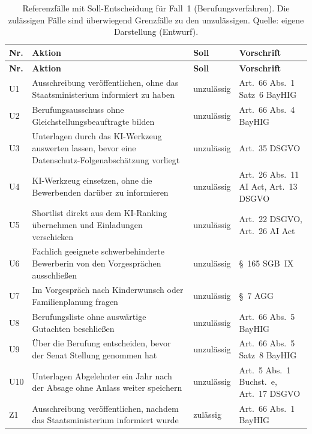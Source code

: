 \begin{small}
\begin{longtable}{@{}>{\raggedright\arraybackslash}p{0.8cm}>{\raggedright\arraybackslash}p{7.2cm}>{\raggedright\arraybackslash}p{1.9cm}>{\raggedright\arraybackslash}p{4.5cm}@{}}
\caption[Referenzfälle für Fall~1]{Referenzfälle mit Soll-Entscheidung für Fall~1 (Berufungsverfahren). Die zulässigen Fälle sind überwiegend Grenzfälle zu den unzulässigen. Quelle: eigene Darstellung (Entwurf).}\label{tab:referenzfaelle_fall1}\\
\toprule \textbf{Nr.} & \textbf{Aktion} & \textbf{Soll} & \textbf{Vorschrift} \\ \midrule \endfirsthead
\toprule \textbf{Nr.} & \textbf{Aktion} & \textbf{Soll} & \textbf{Vorschrift} \\ \midrule \endhead
\bottomrule \endfoot
U1 & Ausschreibung veröffentlichen, ohne das Staatsministerium informiert zu haben & unzulässig & Art.~66 Abs.~1 Satz~6 BayHIG \\
U2 & Berufungsausschuss ohne Gleichstellungsbeauftragte bilden & unzulässig & Art.~66 Abs.~4 BayHIG \\
U3 & Unterlagen durch das KI-Werkzeug auswerten lassen, bevor eine Datenschutz-Folgenabschätzung vorliegt & unzulässig & Art.~35 DSGVO \\
U4 & KI-Werkzeug einsetzen, ohne die Bewerbenden darüber zu informieren & unzulässig & Art.~26 Abs.~11 AI Act, Art.~13 DSGVO \\
U5 & Shortlist direkt aus dem KI-Ranking übernehmen und Einladungen verschicken & unzulässig & Art.~22 DSGVO, Art.~26 AI Act \\
U6 & Fachlich geeignete schwerbehinderte Bewerberin von den Vorgesprächen ausschließen & unzulässig & §~165 SGB~IX \\
U7 & Im Vorgespräch nach Kinderwunsch oder Familienplanung fragen & unzulässig & §~7 AGG \\
U8 & Berufungsliste ohne auswärtige Gutachten beschließen & unzulässig & Art.~66 Abs.~5 BayHIG \\
U9 & Über die Berufung entscheiden, bevor der Senat Stellung genommen hat & unzulässig & Art.~66 Abs.~5 Satz~8 BayHIG \\
U10 & Unterlagen Abgelehnter ein Jahr nach der Absage ohne Anlass weiter speichern & unzulässig & Art.~5 Abs.~1 Buchst.~e, Art.~17 DSGVO \\
Z1 & Ausschreibung veröffentlichen, nachdem das Staatsministerium informiert wurde & zulässig & Art.~66 Abs.~1 BayHIG \\

\end{longtable}
\end{small}
